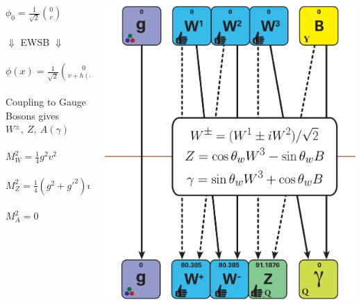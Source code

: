 \documentclass{beamer}
\newcommand*{\header}[1]{\fontsize{16}{8}\selectfont \textbf{{\color{MyPurple}{#1}}}}
\begin{document}
\begin{frame}
\begin{center}
\header{Higgs Mechanism}
\end{center}
\begin{columns}
\begin{column}{0.5\textwidth}
\color{MyPurple}{Scalar Boson}\color{black}
\begin{center}
$\phi_0 = \frac{1}{\sqrt{2}}\binom{0}{v}$\\~\\
\huge$\Downarrow$ \normalsize EWSB \huge$\Downarrow$ \normalsize\\~\\
$\phi(x) = \frac{1}{\sqrt{2}}\binom{0}{v + h(x)}$\\~\\
Coupling to Gauge Bosons gives $W^{\pm},\ Z,\ A(\gamma)$\\~\\
$M_W^2 = \frac{1}{4}g^2v^2$\\~\\
\vspace{-0.3cm}$M_Z^2 = \frac{1}{4}(g^2 + g'^{2})v^2$\\~\\
\vspace{-0.3cm}$M_A^2 = 0$
\end{center}
\end{column}
\begin{column}{0.5\textwidth}
\includegraphics[width=1\textwidth]{figures/Higgs_mech}
\end{column}
\end{columns}
\end{frame}
\end{document}

